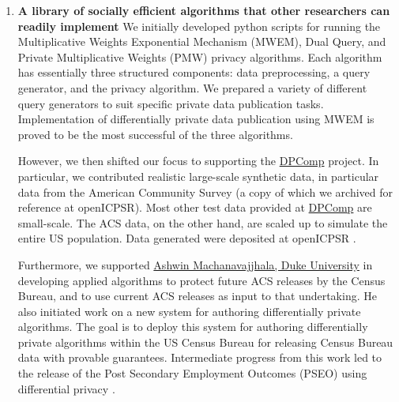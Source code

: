 \documentclass[12pt]{article}
\begin{document}
\begin{enumerate}
	\item \textbf{A library of socially efficient algorithms that other researchers can readily implement}
	We initially developed  python scripts for running the Multiplicative Weights Exponential Mechanism (MWEM), Dual Query, and Private Multiplicative Weights (PMW) privacy algorithms. Each algorithm has essentially three structured components: data preprocessing, a query generator, and the privacy algorithm.  We prepared a variety of different query generators to suit specific private data publication tasks. Implementation of differentially private data publication using MWEM is proved to be the most successful of the three algorithms.

	However, we then shifted our focus to supporting  the \href{https://www.dpcomp.org/}{DPComp} project. In particular, we contributed realistic large-scale synthetic data, in particular data from the American Community Survey \parencite{ACS2010-2014} (a copy of which we archived for reference at openICPSR).  Most other test data provided at \href{https://www.dpcomp.org/}{DPComp} are small-scale. The ACS data, on the other hand, are scaled up to simulate the entire US population. Data generated were deposited at openICPSR \parencite{openicpsr:e100274v1}.

    Furthermore, we supported \href{http://users.cs.duke.edu/~ashwin/}{Ashwin Machanavajjhala, Duke University} in developing applied algorithms to protect future ACS releases by the Census Bureau, and to use current ACS releases as input to that undertaking. He  also initiated work on a new system for authoring differentially private algorithms. The goal is to deploy this system for authoring differentially private algorithms within the US Census Bureau for releasing Census Bureau data with provable guarantees. Intermediate progress from this work led to the release of the Post Secondary Employment Outcomes (PSEO) using differential privacy \parencite{FooteAshwinMcKinney:JPC:2019}.




\end{enumerate}
\end{document}

